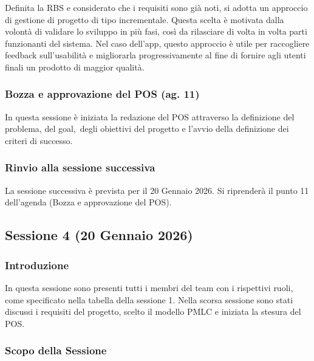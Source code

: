 \documentclass[11pt,a4paper]{article}
\begin{document}
{Definita la RBS e considerato che i requisiti sono già noti, si adotta un approccio di gestione di progetto di tipo incrementale. Questa scelta è motivata dalla volontà di validare lo sviluppo in più fasi, così da rilasciare di volta in volta parti funzionanti del sistema. Nel caso dell’app, questo approccio è utile per raccogliere feedback sull’usabilità e migliorarla progressivamente al fine di fornire agli utenti finali un prodotto di maggior qualità.}

\subsubsection{\texorpdfstring{{Bozza e approvazione del POS (ag. 11)}}{Bozza e approvazione del POS (ag. 11)}}\label{h.5yjx4r1o32t0}

{In questa sessione è iniziata la redazione del POS attraverso la definizione del problema, del }{goal,}{~degli obiettivi del progetto e l’avvio della definizione dei criteri di successo.}

\subsubsection{\texorpdfstring{{Rinvio alla sessione successiva}}{Rinvio alla sessione successiva}}\label{h.6bbowp2bwy8}

La sessione successiva è prevista per il 20 Gennaio 2026. Si riprenderà il punto 11 dell’agenda (Bozza e approvazione del POS).

\subsection{\texorpdfstring{{Sessione 4 (20 Gennaio 2026) }}{Sessione 4 (20 Gennaio 2026) }}\label{h.1vm9lnt9earl}

\subsubsection{\texorpdfstring{{Introduzione}}{Introduzione}}\label{h.kjtm0e2c7g4n}

{In questa sessione sono presenti tutti i membri del team con i rispettivi ruoli, come specificato nella tabella della sessione 1. Nella scorsa sessione sono stati discussi i requisiti del progetto, scelto il modello PMLC e iniziata la stesura del POS.}

\subsubsection{\texorpdfstring{{Scopo della Sessione}}{Scopo della Sessione}}\label{h.1su9wwujqrdp}
\end{document}
